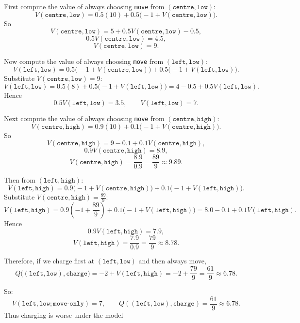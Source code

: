 \begin{enumerate}
\begin{solution}
First compute the value of always choosing \texttt{move} from
$(\texttt{centre},\texttt{low})$:
\[
V(\texttt{centre},\texttt{low})
= 0.5(10) + 0.5\bigl(-1 + V(\texttt{centre},\texttt{low})\bigr).
\]
So
\[
V(\texttt{centre},\texttt{low}) = 5 + 0.5V(\texttt{centre},\texttt{low}) - 0.5,
\]
\[
0.5V(\texttt{centre},\texttt{low}) = 4.5,
\]
\[
V(\texttt{centre},\texttt{low}) = 9.
\]

Now compute the value of always choosing \texttt{move} from
$(\texttt{left},\texttt{low})$:
\[
V(\texttt{left},\texttt{low})
= 0.5\bigl(-1 + V(\texttt{centre},\texttt{low})\bigr)
+ 0.5\bigl(-1 + V(\texttt{left},\texttt{low})\bigr).
\]
Substitute $V(\texttt{centre},\texttt{low})=9$:
\[
V(\texttt{left},\texttt{low})
= 0.5(8) + 0.5\bigl(-1 + V(\texttt{left},\texttt{low})\bigr)
= 4 - 0.5 + 0.5V(\texttt{left},\texttt{low}).
\]
Hence
\[
0.5V(\texttt{left},\texttt{low}) = 3.5,
\qquad
V(\texttt{left},\texttt{low}) = 7.
\]

Next compute the value of always choosing \texttt{move} from
$(\texttt{centre},\texttt{high})$:
\[
V(\texttt{centre},\texttt{high})
= 0.9(10) + 0.1\bigl(-1 + V(\texttt{centre},\texttt{high})\bigr).
\]
So
\[
V(\texttt{centre},\texttt{high})
= 9 - 0.1 + 0.1V(\texttt{centre},\texttt{high}),
\]
\[
0.9V(\texttt{centre},\texttt{high}) = 8.9,
\]
\[
V(\texttt{centre},\texttt{high}) = \frac{8.9}{0.9} = \frac{89}{9}\approx 9.89.
\]

Then from $(\texttt{left},\texttt{high})$:
\[
V(\texttt{left},\texttt{high})
= 0.9\bigl(-1 + V(\texttt{centre},\texttt{high})\bigr)
+ 0.1\bigl(-1 + V(\texttt{left},\texttt{high})\bigr).
\]
Substitute $V(\texttt{centre},\texttt{high})=\frac{89}{9}$:
\[
V(\texttt{left},\texttt{high})
= 0.9\left(-1+\frac{89}{9}\right)
+0.1\bigl(-1+V(\texttt{left},\texttt{high})\bigr)
= 8.0-0.1+0.1V(\texttt{left},\texttt{high}).
\]
Hence
\[
0.9V(\texttt{left},\texttt{high}) = 7.9,
\]
\[
V(\texttt{left},\texttt{high}) = \frac{7.9}{0.9} = \frac{79}{9}\approx 8.78.
\]

Therefore, if we charge first at $(\texttt{left},\texttt{low})$ and then always move,
\[
Q\bigl((\texttt{left},\texttt{low}),\texttt{charge}\bigr)
= -2 + V(\texttt{left},\texttt{high})
= -2 + \frac{79}{9}
= \frac{61}{9}\approx 6.78.
\]

So:
\[
V(\texttt{left},\texttt{low};\texttt{move-only}) = 7,
\qquad
Q((\texttt{left},\texttt{low}),\texttt{charge}) = \frac{61}{9}\approx 6.78.
\]
Thus charging is worse under the model
\end{solution}

\end{enumerate}